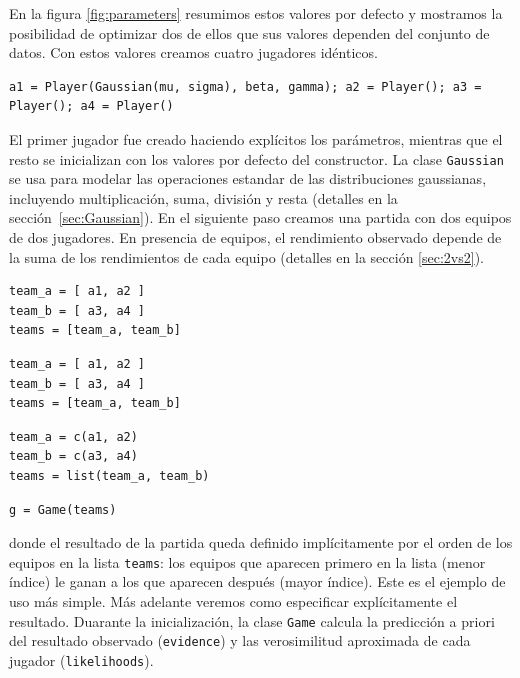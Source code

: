 \documentclass[a4paper,11pt]{book}
\theoremstyle{definition}
\begin{document}
%
En la figura \ref{fig:parameters} resumimos estos valores por defecto y mostramos la posibilidad de optimizar dos de ellos que sus valores dependen del conjunto de datos.
%
Con estos valores creamos cuatro jugadores idénticos.
%
\begin{lstlisting}[captionpos=b,backgroundcolor=\color{all},label=lst:player, caption={Inicializaci\'on de los jugadores}, belowskip=0cm]
a1 = Player(Gaussian(mu, sigma), beta, gamma); a2 = Player(); a3 = Player(); a4 = Player()
\end{lstlisting}
%
El primer jugador fue creado haciendo explícitos los parámetros, mientras que el resto se inicializan con los valores por defecto del constructor.
%
La clase \texttt{Gaussian} se usa para modelar las operaciones estandar de las distribuciones gaussianas, incluyendo multiplicaci\'on, suma, divisi\'on y resta (detalles en la secci\'on~\ref{sec:Gaussian}).
%
En el siguiente paso creamos una partida con dos equipos de dos jugadores.
%
En presencia de equipos, el rendimiento observado depende de la suma de los rendimientos de cada equipo (detalles en la secci\'on \ref{sec:2vs2}).
%
\begin{paracol}{3}
\begin{lstlisting}[backgroundcolor=\color{julia!60}, belowskip=0cm]
team_a = [ a1, a2 ]
team_b = [ a3, a4 ]
teams = [team_a, team_b]
\end{lstlisting}
  \switchcolumn
\begin{lstlisting}[backgroundcolor=\color{python!60}, belowskip=0cm]
team_a = [ a1, a2 ]
team_b = [ a3, a4 ]
teams = [team_a, team_b]
\end{lstlisting}
   \switchcolumn
\begin{lstlisting}[backgroundcolor=\color{r!50}, belowskip=0cm]
team_a = c(a1, a2)
team_b = c(a3, a4)
teams = list(team_a, team_b)
\end{lstlisting}
\end{paracol}
\begin{lstlisting}[captionpos=b,backgroundcolor=\color{all},label=lst:game,caption={Equipos e inicializaci\'on del juego}, aboveskip=0cm,belowskip=0cm]
g = Game(teams)
\end{lstlisting}
%
donde el resultado de la partida queda definido implícitamente por el orden de los equipos en la lista \texttt{teams}: los equipos que aparecen primero en la lista (menor índice) le ganan a los que aparecen después (mayor índice).
%
Este es el ejemplo de uso más simple.
%
Más adelante veremos como especificar explícitamente el resultado.
%
Duarante la inicializaci\'on, la clase \texttt{Game} calcula la predicci\'on a priori del resultado observado (\texttt{evidence}) y las verosimilitud aproximada de cada jugador (\texttt{likelihoods}).
\end{document}
